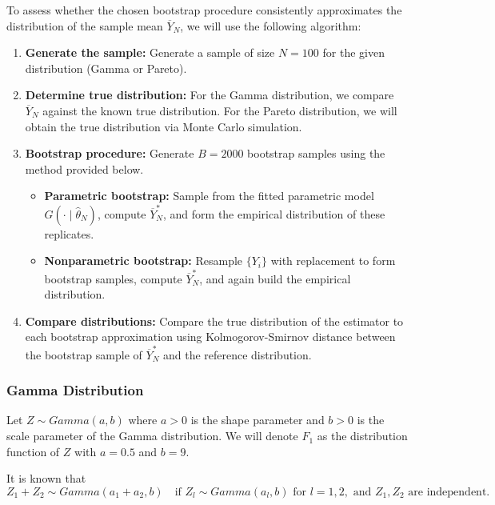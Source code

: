 \documentclass{article}
\begin{document}
To assess whether the chosen bootstrap procedure consistently approximates the distribution of the sample mean \(\overline{Y}_N\), we will use the following algorithm:

\begin{enumerate}
  \item \textbf{Generate the sample:} Generate a sample of size \(N = 100\) for the given distribution (Gamma or Pareto).
  \item \textbf{Determine true distribution:} For the Gamma distribution, we compare \(\overline{Y}_N\) against the known true distribution. For the Pareto distribution, we will obtain the true distribution via Monte Carlo simulation.
  \item \textbf{Bootstrap procedure:} Generate \(B = 2000\) bootstrap samples using the method provided below.
    \begin{itemize}
        \item \textbf{Parametric bootstrap:} Sample from the fitted parametric model \(G(\cdot \mid \hat{\theta}_N)\), compute \(\overline{Y}_N^*\), and form the empirical distribution of these replicates.
        \item \textbf{Nonparametric bootstrap:} Resample \(\{Y_i\}\) with replacement to form bootstrap samples, compute \(\overline{Y}_N^*\), and again build the empirical distribution.
    \end{itemize}
  \item \textbf{Compare distributions:} Compare the true distribution of the estimator to each bootstrap approximation using Kolmogorov-Smirnov distance between the bootstrap sample of \(\overline{Y}_N^*\) and the reference distribution.
\end{enumerate}

\subsubsection{Gamma Distribution}

Let \(Z \sim Gamma(a, b)\) where \(a > 0\) is the shape parameter and \(b > 0\) is the scale parameter of the Gamma distribution. We will denote \(F_1\) as the distribution function of \(Z\) with \(a = 0.5\) and \(b = 9\).

It is known that
\[
Z_1 + Z_2 \sim Gamma(a_1 + a_2, b) \quad \text{if } Z_l \sim Gamma(a_l, b) \text{ for } l = 1, 2, \text{ and } Z_1, Z_2 \text{ are independent}.
\]
\end{document}
